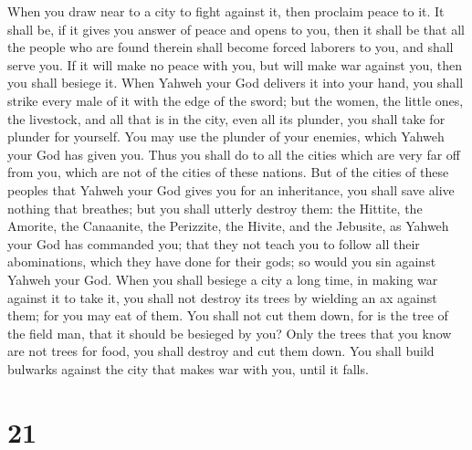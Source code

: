  When you draw near to a city to fight against it, then
proclaim peace to it.  It shall be, if it gives you
answer of peace and opens to you, then it shall be that all the people
who are found therein shall become forced laborers to you, and shall
serve you.  If it will make no peace with you, but will
make war against you, then you shall besiege it.  When
Yahweh your God delivers it into your hand, you shall strike every male
of it with the edge of the sword;  but the women, the
little ones, the livestock, and all that is in the city, even all its
plunder, you shall take for plunder for yourself. You may use the
plunder of your enemies, which Yahweh your God has given you.
 Thus you shall do to all the cities which are very far
off from you, which are not of the cities of these nations.
 But of the cities of these peoples that Yahweh your God
gives you for an inheritance, you shall save alive nothing that
breathes;  but you shall utterly destroy them: the
Hittite, the Amorite, the Canaanite, the Perizzite, the Hivite, and the
Jebusite, as Yahweh your God has commanded you;  that
they not teach you to follow all their abominations, which they have
done for their gods; so would you sin against Yahweh your God.
 When you shall besiege a city a long time, in making war
against it to take it, you shall not destroy its trees by wielding an ax
against them; for you may eat of them. You shall not cut them down, for
is the tree of the field man, that it should be besieged by you?
 Only the trees that you know are not trees for food, you
shall destroy and cut them down. You shall build bulwarks against the
city that makes war with you, until it falls.

\hypertarget{section-20}{%
\section{21}\label{section-20}}

